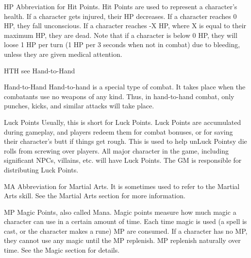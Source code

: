 \documentclass[twoside]{book}
\begin{document}
              
               HP   
                  Abbreviation for Hit Points. Hit Points are used
                 to represent a character’s health. If a character
                 gets injured, their HP decreases. If a character reaches
                 0 HP, they fall unconscious. If a character reaches -X
                 HP, where X is equal to their maximum HP, they are dead.
                 Note that if a character is below 0 HP, they will loose
                 1 HP per turn (1 HP per 3 seconds when not in combat)
                 due to bleeding, unless they are given medical
                 attention. 
              
              
               HTH   
                see Hand-to-Hand   
              
              
               Hand-to-Hand   
                  Hand-to-hand is a special type of combat. It
                 takes place when the combatants use no weapons of any
                 kind. Thus, in hand-to-hand combat, only punches, kicks,
                 and similar attacks will take place. 
              
              
               Luck Points   
                  Usually, this is short for Luck Points. Luck
                 Points are accumulated during gameplay, and players
                 redeem them for combat bonuses, or for saving their
                 character’s butt if things get rough. This is used
                 to help unLuck Pointsy die rolls from screwing over
                 players. All major character in the game, including
                 significant NPCs, villains, etc. will have Luck Points.
                 The GM is responsible for distributing Luck Points.
                 
              
              
               MA   
                  Abbreviation for Martial Arts. It is sometimes
                 used to refer to the Martial Arts skill. See the Martial
                 Arts section for more information. 
              
              
               MP   
                  Magic Points, also called Mana. Magic points
                 measure how much magic a character can use in a certain
                 amount of time. Each time magic is used (a spell is
                 cast, or the character makes a rune) MP are consumed. If
                 a character has no MP, they cannot use any magic until
                 the MP replenish. MP replenish naturally over time. See
                 the Magic section for details. 
              
\end{document}
